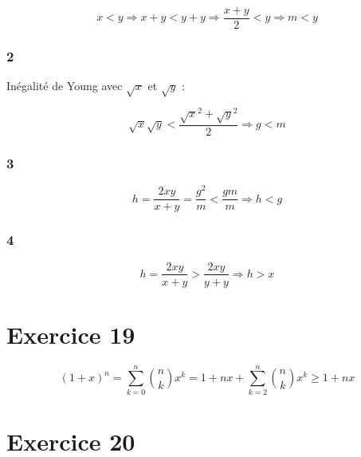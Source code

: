 \documentclass{report}
\begin{document}
\begin{displaymath}
	x < y \Rightarrow x + y < y + y \Rightarrow \frac{x+y}{2} < y \Rightarrow m <y
\end{displaymath}

\subsubsection*{2}

Inégalité de Young avec $\sqrt{x}$ et $\sqrt{y}$ :

\begin{displaymath}
	\sqrt{x} \sqrt{y} < \frac{\sqrt{x}^2 + \sqrt{y}^2}{2} \Rightarrow g<m
\end{displaymath}

\subsubsection*{3}

\begin{displaymath}
	h = \frac{2xy}{x+y} = \frac{g^2}{m} < \frac{gm}{m} \Rightarrow h < g
\end{displaymath}

\subsubsection*{4}

\begin{displaymath}
	h = \frac{2xy}{x+y} > \frac{2xy}{y+y} \Rightarrow h > x
\end{displaymath}

\section*{Exercice 19}
\begin{displaymath}
	(1+x)^n = \sum_{k=0}^{n}\binom{n}{k}x^k = 1 + nx + \sum_{k=2}^{n}\binom{n}{k}x^k \geq 1 + nx
\end{displaymath}

\section*{Exercice 20}
\end{document}
